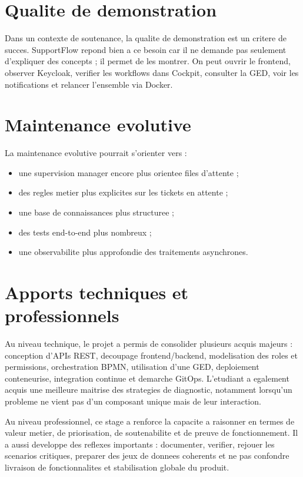 \section{Qualite de demonstration}

Dans un contexte de soutenance, la qualite de demonstration est un critere de succes. SupportFlow repond bien a ce besoin car il ne demande pas seulement d'expliquer des concepts ; il permet de les montrer. On peut ouvrir le frontend, observer Keycloak, verifier les workflows dans Cockpit, consulter la GED, voir les notifications et relancer l'ensemble via Docker.

\section{Maintenance evolutive}

La maintenance evolutive pourrait s'orienter vers :

\begin{itemize}[leftmargin=1.2cm]
  \item une supervision manager encore plus orientee files d'attente ;
  \item des regles metier plus explicites sur les tickets en attente ;
  \item une base de connaissances plus structuree ;
  \item des tests end-to-end plus nombreux ;
  \item une observabilite plus approfondie des traitements asynchrones.
\end{itemize}

\section{Apports techniques et professionnels}

Au niveau technique, le projet a permis de consolider plusieurs acquis majeurs : conception d'APIs REST, decoupage frontend/backend, modelisation des roles et permissions, orchestration BPMN, utilisation d'une GED, deploiement conteneurise, integration continue et demarche GitOps. L'etudiant a egalement acquis une meilleure maitrise des strategies de diagnostic, notamment lorsqu'un probleme ne vient pas d'un composant unique mais de leur interaction.

Au niveau professionnel, ce stage a renforce la capacite a raisonner en termes de valeur metier, de priorisation, de soutenabilite et de preuve de fonctionnement. Il a aussi developpe des reflexes importants : documenter, verifier, rejouer les scenarios critiques, preparer des jeux de donnees coherents et ne pas confondre livraison de fonctionnalites et stabilisation globale du produit.

